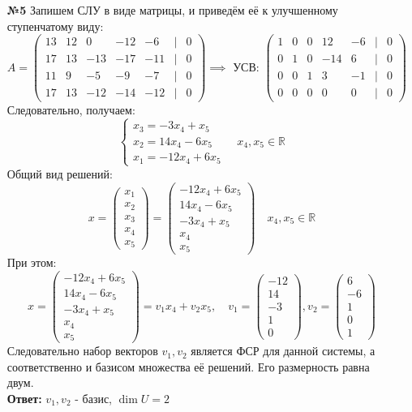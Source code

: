 \documentclass[a4paper]{article}
\newcommand{\mat}[1]{\begin{pmatrix} #1 \end{pmatrix}}
\newcommand{\case}[1]{\begin{cases} #1 \end{cases}}
\newcommand{\RR}{\mathbb{R}}
\begin{document}
\begin{enumerate}
    \item[\textbf{№5}]Запишем СЛУ в виде матрицы, и приведём её к улучшенному ступенчатому виду: 
    $$A =
    \begin{pmatrix}
    13 & 12 & 0 & -12 & -6 & | & 0\\
    17 & 13 & -13 & -17 & -11& | & 0 \\
    11 & 9 & -5 & -9 & -7 & | & 0\\
    17 & 13 & -12 & -14 & -12& | & 0
    \end{pmatrix}
    \implies \text{ УСВ: }\begin{pmatrix}
        1 & 0 & 0 & 12 & -6 &| & 0 \\
        0 & 1 & 0 & -14 & 6 &| & 0 \\
        0 & 0 & 1 & 3 & -1 &| & 0 \\
        0 & 0 & 0 & 0 & 0 & | &0
        \end{pmatrix}$$
    Следовательно, получаем:
    $$\case{
        x_3 = -3x_4+x_5\\
        x_2 = 14x_4-6x_5\\
        x_1 = -12x_4+6x_5
    } \quad x_4, x_5 \in \RR$$
    Общий вид решений:
    $$x = \mat{x_1\\x_2\\x_3\\x_4\\x_5} = \mat{-12x_4+6x_5\\14x_4-6x_5\\-3x_4+x_5\\x_4\\x_5}\quad x_4, x_5 \in \RR$$
    При этом:
    $$x = \mat{-12x_4+6x_5\\14x_4-6x_5\\-3x_4+x_5\\x_4\\x_5} = v_1x_4 + v_2x_5, \quad v_1 = \mat{-12\\14\\-3\\1\\0}, v_2 = \mat{6\\-6\\1\\0\\1}$$
    Следовательно набор векторов $v_1, v_2$ является ФСР для данной системы, а соответственно и базисом множества её решений. Его размерность равна двум.\\
    \textbf{Ответ: }$v_1, v_2$ - базис, $\dim{U} = 2$

\end{enumerate}
\end{document}

